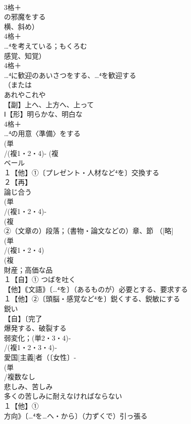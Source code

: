 \documentclass[8pt]{extreport}
\begin{document}
\begin{CJK}{UTF8}{min}
\\	3格＋
\\	の邪魔をする 
\\	横、斜め）
\\	4格＋
\\	…⁴を考えている；もくろむ 
\\	感覚、知覚）
\\	4格＋
\\	…⁴に歓迎のあいさつをする、…⁴を歓迎する
\\	（または
\\	あれやこれや
\\	【副】上へ、上方へ、上って 
\\	Ⅰ【形】明らかな、明白な 
\\	4格＋
\\	…⁴の用意〈準備〉をする
\\	(単
\\	/(複1・2・4)- (複
\\	ベール 
\\	１【他】①〔プレゼント・人材など⁴を〕交換する 
\\	２【再】
\\	論じ合う
\\	(単
\\	/(複1・2・4)-
\\	(複
\\	②（文章の）段落；（書物・論文などの）章、節 （[略]
\\	(単
\\	/(複1・2・4)
\\	(複
\\	財産；高価な品 
\\	１【自】① つばを吐く 
\\	【他】｟文語｠〔…⁴を〕（あるものが）必要とする、要求する 
\\	１【他】②〔頭脳・感覚など⁴を〕鋭くする、鋭敏にする 
\\	鋭い
\\	【自】〔完了
\\	爆発する、破裂する 
\\	弱変化；(単2・3・4)‐
\\	/(複1・2・3・4)‐
\\	愛国[主義]者（〔女性〕-
\\	(単
\\	/複数なし 
\\	悲しみ、苦しみ 
\\	多くの苦しみに耐えなければならない
\\	１【他】①
\\	方向》〔…⁴を…へ・から〕（力ずくで）引っ張る 

\end{CJK}
\end{document}
